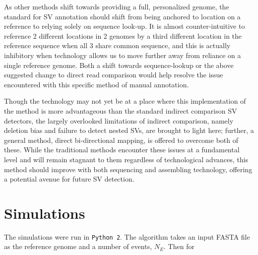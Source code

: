 \documentclass{easychithesis}
\begin{document}
As other methods shift towards providing a full, personalized genome, the standard for SV annotation should shift from being anchored to location on a reference to relying solely on sequence look-up. It is almost counter-intuitive to reference 2 different locations in 2 genomes by a third different location in the reference sequence when all 3 share common sequence, and this is actually inhibitory when technology allows us to move further away from reliance on a single reference genome. Both a shift towards sequence-lookup or the above suggested change to direct read comparison would help resolve the issue encountered with this specific method of manual annotation.

Though the technology may not yet be at a place where this implementation of the method is more advantageous than the standard indirect comparison SV detectors, the largely overlooked limitations of indirect comparison, namely deletion bias and failure to detect nested SVs, are brought to light here; further, a general method, direct bi-directional mapping, is offered to overcome both of these. While the traditional methods encounter these issues at a fundamental level and will remain stagnant to them regardless of technological advances, this method should improve with both sequencing and assembling technology, offering a potential avenue for future SV detection.

%
%
\appendix
\chapter{Simulations}
The simulations were run in \texttt{Python 2}. The algorithm takes an input FASTA file as the reference genome and a number of events, $N_E$. Then for
\end{document}
